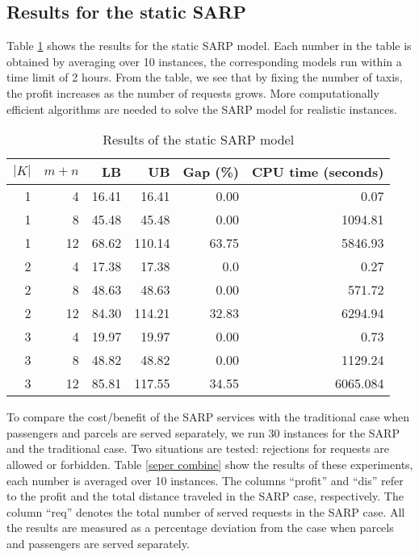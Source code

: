 \documentclass[preprint,authoryear,12pt]{elsarticle}
\begin{document}
\subsection{Results for the static SARP}
\label{ssarp_results}
Table \ref{sarpgain} shows the results for the static SARP model. Each number in the table is obtained by averaging over 10 instances, the corresponding models run within a time limit of 2 hours. From the table, we see that by fixing the number of taxis, the profit increases as the number of requests grows. More computationally efficient algorithms are needed to solve the SARP model for realistic instances.


\begin{table} [!htbp]
\caption{Results of the static SARP model}
\vspace{-1em}
\center
\small
\begin{tabular}{r r r r r r }
\hline
$|K|$& $m+n$ & LB & UB & Gap (\%) & CPU time (seconds)\\
\hline
1 & 4 &16.41  &  16.41  &  0.00  &  0.07\\
1 & 8 &45.48  &  45.48  &  0.00  &  1094.81\\
1 & 12 & 68.62 &  110.14  &  63.75 &  5846.93\\
2 & 4 & 17.38 &  17.38  &  0.0  &  0.27\\
2 & 8 & 48.63  &  48.63  &  0.00 &  571.72\\
2 & 12 & 84.30 &  114.21  &  32.83 &  6294.94\\
3 & 4 & 19.97  &  19.97 &  0.00  &  0.73\\
3 & 8 & 48.82  &  48.82  &  0.00  &  1129.24\\
3 & 12& 85.81 &  117.55  &  34.55  &  6065.084\\
\hline
\end{tabular}
\label{sarpgain}
\end{table}



To compare the cost/benefit of the SARP services with the traditional case when passengers and parcels are served separately, we run 30 instances for the SARP and the traditional case. Two situations are tested: rejections for requests are allowed or forbidden. Table \ref{seper combine} show the results of these experiments, each number is averaged over 10 instances. The columns ``profit'' and  ``dis'' refer to the profit and the total distance traveled in the SARP case, respectively. The column ``req'' denotes the total number of served requests in the SARP case. All the results are measured as a percentage deviation from the case when parcels and passengers are served separately.
\end{document}
